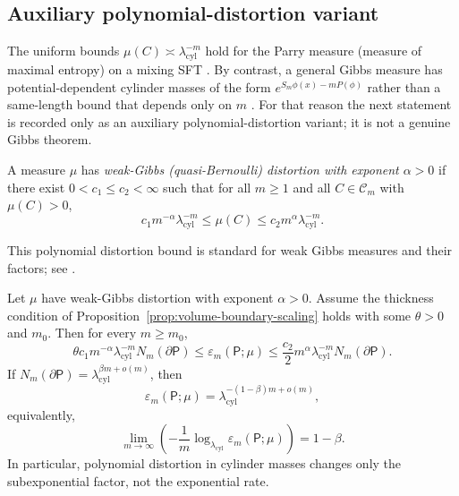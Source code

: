\subsection{Auxiliary polynomial-distortion variant}
\label{sub:nonuniform}

The uniform bounds $\mu(C)\asymp\lambda_{\mathrm{cyl}}^{-m}$ hold for the
Parry measure (measure of maximal entropy) on a mixing SFT
\cite{Parry1964}.  By contrast, a general Gibbs measure has
potential-dependent cylinder masses of the form
$e^{S_m\phi(x)-mP(\phi)}$ rather than a same-length bound that depends only on
$m$ \cite{Bowen1975,WaltersErgodicTheory}.  For that reason the next statement
is recorded only as an auxiliary polynomial-distortion variant; it is not a
genuine Gibbs theorem.

\begin{definition}
\label{def:log-regular}
A measure $\mu$ has \emph{weak-Gibbs (quasi-Bernoulli) distortion with exponent $\alpha>0$} if there exist
$0<c_1\le c_2<\infty$ such that for all $m\ge 1$ and all $C\in\mathcal{C}_m$
with $\mu(C)>0$,
\[
c_1 m^{-\alpha}\lambda_{\mathrm{cyl}}^{-m}\le\mu(C)\le c_2 m^{\alpha}\lambda_{\mathrm{cyl}}^{-m}.
\]
\end{definition}

This polynomial distortion bound is standard for weak Gibbs measures and their
factors; see \cite{Bowen1975,WaltersErgodicTheory}.

\begin{proposition}
\label{prop:nonuniform-cylinder}
Let $\mu$ have weak-Gibbs distortion with exponent $\alpha>0$.  Assume the thickness
condition of Proposition~\ref{prop:volume-boundary-scaling} holds with some
$\theta>0$ and $m_0$.  Then for every $m\ge m_0$,
\[
\theta c_1 m^{-\alpha}\lambda_{\mathrm{cyl}}^{-m}N_m(\partial\mathsf{P})
\le\varepsilon_m(\mathsf{P};\mu)
\le \frac{c_2}{2}m^{\alpha}\lambda_{\mathrm{cyl}}^{-m}N_m(\partial\mathsf{P}).
\]
If $N_m(\partial\mathsf{P})=\lambda_{\mathrm{cyl}}^{\beta m+o(m)}$, then
\[
\varepsilon_m(\mathsf{P};\mu)=\lambda_{\mathrm{cyl}}^{-(1-\beta)m+o(m)},
\]
equivalently,
\[
\lim_{m\to\infty}\left(-\frac{1}{m}\log_{\lambda_{\mathrm{cyl}}}\varepsilon_m(\mathsf{P};\mu)\right)=1-\beta.
\]
In particular, polynomial distortion in cylinder masses changes only the
subexponential factor, not the exponential rate.
\end{proposition}


